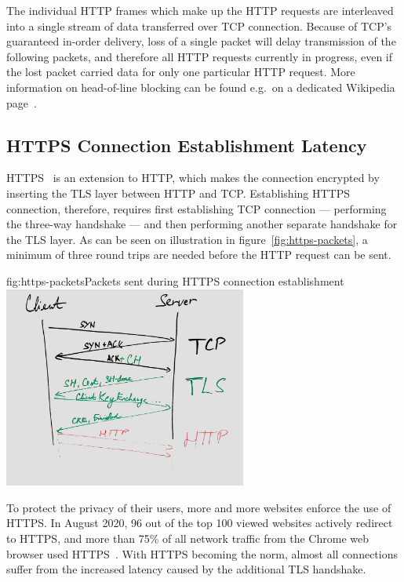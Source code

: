The individual HTTP frames which make up the HTTP requests are interleaved into a single stream of
data transferred over TCP connection. Because of TCP's guaranteed in-order delivery, loss of a
single packet will delay transmission of the following packets, and therefore all HTTP requests
currently in progress, even if the lost packet carried data for only one particular HTTP request.
More information on head-of-line blocking can be found e.g.\ on a dedicated Wikipedia
page~\cite{wiki:head-of-line_blocking}.

\subsection*{HTTPS Connection Establishment Latency}
HTTPS~\cite{rfc2818} is an extension to HTTP, which makes the connection encrypted by inserting the
TLS layer between HTTP and TCP\@. Establishing HTTPS connection, therefore, requires first
establishing TCP connection --- performing the three-way handshake --- and then performing another
separate handshake for the TLS layer. As can be seen on illustration in
figure~\ref{fig:https-packets}, a minimum of three round trips are needed before the HTTP request
can be sent.

\begin{myFigure}{fig:https-packets}{Packets sent during HTTPS connection establishment}
  \includegraphics[width=0.6\textwidth]{img/01-https-connection-packets}
\end{myFigure}

To protect the privacy of their users, more and more websites enforce the use of HTTPS\@.
In August 2020, 96 out of the top 100 viewed websites actively redirect to HTTPS, and more than 75\%
of all network traffic from the Chrome web browser used HTTPS~\cite{googleTransparency}. With HTTPS
becoming the norm, almost all connections suffer from the increased latency caused by the
additional TLS handshake.

